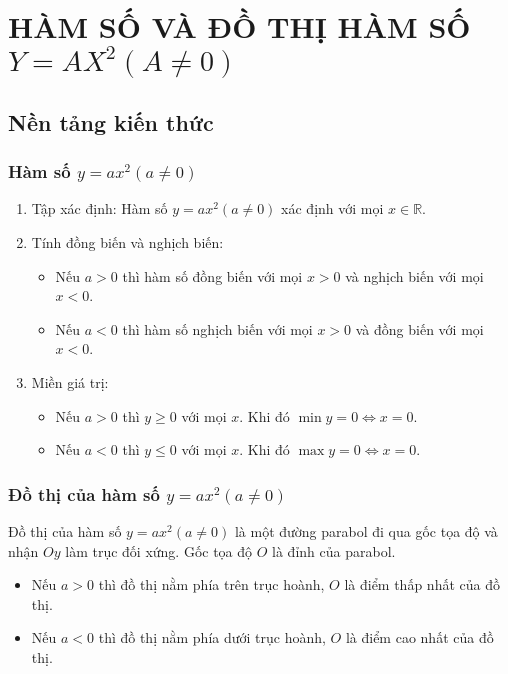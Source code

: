 \section{HÀM SỐ VÀ ĐỒ THỊ HÀM SỐ $ Y = AX^2(A \neq 0) $}

\subsection{Nền tảng kiến thức}
\subsubsection{Hàm số $ y = ax^2 (a \neq 0) $}
\begin{enumerate}
	\item Tập xác định: Hàm số $ y = ax^2 (a \neq 0) $ xác định với mọi $ x \in \mathbb{R} $.
	\item Tính đồng biến và nghịch biến:
	\begin{itemize}
		\item Nếu $ a > 0 $ thì hàm số đồng biến với mọi $ x > 0 $ và nghịch biến với mọi $ x < 0 $.
		\item Nếu $ a < 0 $ thì hàm số nghịch biến với mọi $ x > 0 $ và đồng biến với mọi $ x < 0 $.
	\end{itemize}
	\item Miền giá trị:
	\begin{itemize}
		\item Nếu $ a > 0 $ thì $ y \geqslant 0 $ với mọi $ x $. Khi đó $ \min y = 0 \Leftrightarrow x = 0 $.
		\item Nếu $ a < 0 $ thì $ y \leqslant 0 $ với mọi $ x $. Khi đó $ \max y = 0 \Leftrightarrow x = 0 $.
	\end{itemize}
\end{enumerate}

\subsubsection{Đồ thị của hàm số $ y = ax^2 (a \neq 0) $}
Đồ thị của hàm số $ y = ax^2 (a \neq 0) $ là một đường parabol đi qua gốc tọa độ và nhận $ Oy $ làm trục đối xứng. Gốc tọa độ $ O $ là đỉnh của parabol.
\begin{itemize}
	\item Nếu $ a > 0 $	 thì đồ thị nằm phía trên trục hoành, $ O $ là điểm thấp nhất của đồ thị.
	\item Nếu $ a < 0 $	 thì đồ thị nằm phía dưới trục hoành, $ O $ là điểm cao nhất của đồ thị.
\end{itemize}

